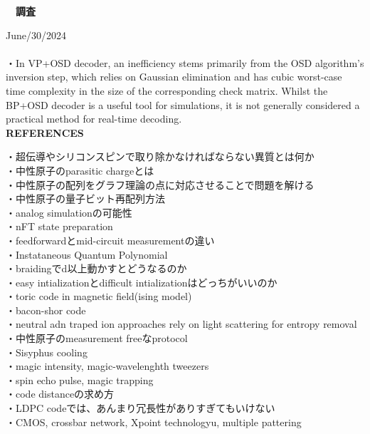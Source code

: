\documentclass[a4paper,10.5pt]{ltjsarticle}
\begin{document}
\centerline
{\huge \bfseries　調査}
\rightline
{June/30/2024}
\leftline
{}
\\
\\
・In VP+OSD decoder, an inefficiency stems primarily from the OSD algorithm's inversion step, which relies on Gaussian elimination and has cubic worst-case time complexity in the size of the corresponding check matrix. Whilst the BP+OSD decoder is a useful tool for simulations, it is not generally considered a practical method for real-time decoding.\\
\clearpage
{\Large \bfseries REFERENCES}
\begin{thebibliography}{1}
\vspace{-1.5cm}
\end{thebibliography}
\vspace{50pt}
・超伝導やシリコンスピンで取り除かなければならない異質とは何か\\
・中性原子のparasitic chargeとは\\
・中性原子の配列をグラフ理論の点に対応させることで問題を解ける\\
・中性原子の量子ビット再配列方法\\
・analog simulationの可能性\\
・nFT state preparation\\
・feedforwardとmid-circuit measurementの違い\\
・Instataneous Quantum Polynomial\\
・braidingでd以上動かすとどうなるのか\\
・easy intializationとdifficult intializationはどっちがいいのか\\
・toric code in magnetic field(ising model)\\
・bacon-shor code\\
・neutral adn traped ion approaches rely on light scattering for entropy removal\\
・中性原子のmeasurement freeなprotocol\\
・Sisyphus cooling\\
・magic intensity, magic-wavelenghth tweezers\\
・spin echo pulse, magic trapping\\
・code distanceの求め方\\
・LDPC codeでは、あんまり冗長性がありすぎてもいけない\\
・CMOS, crossbar network, Xpoint technologyu, multiple pattering\\
\end{document}
